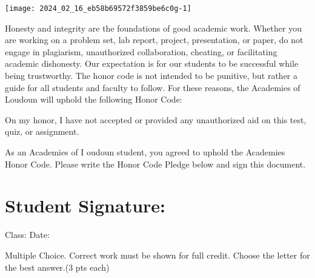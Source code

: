 \documentclass[10pt]{article}
\begin{document}
\begin{center}
\texttt{[image: 2024\_02\_16\_eb58b69572f3859be6c0g-1]}
\end{center}

Honesty and integrity are the foundations of good academic work. Whether you are working on a problem set, lab report, project, presentation, or paper, do not engage in plagiarism, unauthorized collaboration, cheating, or facilitating academic dishonesty. Our expectation is for our students to be successful while being trustworthy. The honor code is not intended to be punitive, but rather a guide for all students and faculty to follow. For these reasons, the Academies of Loudoun will uphold the following Honor Code:

On my honor, I have not accepted or provided any unauthorized aid on this test, quiz, or assignment.

As an Academies of I oudoun student, you agreed to uphold the Academies Honor Code. Please write the Honor Code Pledge below and sign this document.

\section{Student Signature:}
Class: Date:

Multiple Choice. Correct work must be shown for full credit. Choose the letter for the best answer.(3 pts each)
\end{document}
